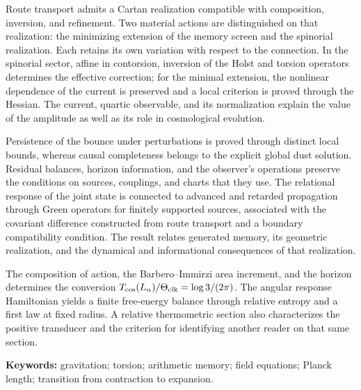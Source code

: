 Route transport admits a Cartan realization compatible with composition,
inversion, and refinement. Two material actions are distinguished on that
realization: the minimizing extension of the memory screen and the
spinorial realization. Each retains its own variation with respect to
the connection. In the spinorial sector, affine in contorsion, inversion
of the Holst and torsion operators determines the effective correction;
for the minimal extension, the nonlinear dependence of the current is
preserved and a local criterion is proved through the Hessian. The
current, quartic observable, and its normalization explain the value of
the amplitude as well as its role in cosmological evolution.

Persistence of the bounce under perturbations is proved through distinct
local bounds, whereas causal completeness belongs to the explicit global
dust solution. Residual balances, horizon information, and the observer's
operations preserve the conditions on sources, couplings, and charts
that they use. The relational response of the joint state is connected
to advanced and retarded propagation through Green operators for finitely
supported sources, associated with the covariant difference constructed
from route transport and a boundary
compatibility condition. The result relates generated memory, its
geometric realization, and the dynamical and informational consequences
of that realization.

The composition of action, the Barbero--Immirzi area increment, and the
horizon determines the conversion
\(T_{\rm cos}(L_\alpha)/\Theta_{\rm clk}=\log3/(2\pi)\).
The angular response Hamiltonian yields a finite free-energy balance
through relative entropy and a first law at fixed radius. A relative
thermometric section also characterizes the positive transducer and
the criterion for identifying another reader on that same section.

\noindent\textbf{Keywords:} gravitation; torsion; arithmetic memory; field equations; Planck length; transition from contraction to expansion.
\par\endgroup
